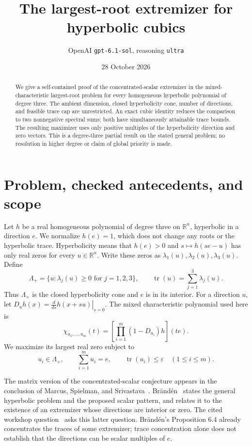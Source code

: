 \documentclass[11pt]{article}
\title{The largest-root extremizer for hyperbolic cubics}
\author{OpenAI \texttt{gpt-6.1-sol}, reasoning \texttt{ultra}}
\date{28 October 2026}
\newcommand{\tr}{\operatorname{tr}}
\newcommand{\Lam}{\Lambda_+}
\begin{document}
\maketitle
\begin{abstract}
We give a self-contained proof of the concentrated-scalar extremizer in the
mixed-characteristic largest-root problem for every homogeneous hyperbolic
polynomial of degree three. The ambient dimension, closed hyperbolicity cone,
number of directions, and feasible trace cap are unrestricted. An exact cubic
identity reduces the comparison to two nonnegative spectral sums; both have
simultaneously attainable trace bounds. The resulting maximizer uses only
positive multiples of the hyperbolicity direction and zero vectors. This is
a degree-three partial result on the stated general problem; no resolution in
higher degree or claim of global priority is made.
\end{abstract}

\section{Problem, checked antecedents, and scope}

Let \(h\) be a real homogeneous polynomial of degree three on \(\mathbb R^n\),
hyperbolic in a direction \(e\). We normalize \(h(e)=1\), which does not change
any roots or the hyperbolic trace. Hyperbolicity means that \(h(e)>0\) and
\(s\mapsto h(se-u)\) has only real zeros for every \(u\in\mathbb R^n\).
Write these zeros as \(\lambda_1(u),\lambda_2(u),\lambda_3(u)\). Define
\[
 \Lam=\{u:\lambda_j(u)\geq0\text{ for }j=1,2,3\},\qquad
 \tr(u)=\sum_{j=1}^3\lambda_j(u).
\]
Thus \(\Lam\) is the closed hyperbolicity cone and \(e\) is in its interior.
For a direction \(u\), let \(D_u h(x)=\left.\frac{d}{ds}h(x+su)\right|_{s=0}\).
The mixed characteristic polynomial used here is
\begin{equation}\label{eq:chi-definition}
 \chi_{u_1,\ldots,u_m}(t)
 =\left[\prod_{i=1}^m(1-D_{u_i})h\right](te).
\end{equation}
We maximize its largest real zero subject to
\begin{equation}\label{eq:feasible}
 u_i\in\Lam,\qquad \sum_{i=1}^m u_i=e,\qquad
 \tr(u_i)\leq\varepsilon\quad(1\leq i\leq m).
\end{equation}

The matrix version of the concentrated-scalar conjecture appears in the
conclusion of Marcus, Spielman, and Srivastava~\cite{MSS}.
Br\"and\'en~\cite[Section 6, Problem 1 and Conjectures 6.1--6.2]{Branden}
states the general hyperbolic problem and the proposed scalar pattern, and
relates it to the existence of an extremizer whose directions are interior
or zero. The cited workshop question~\cite[p.~995]{OWR} asks this latter
question. Br\"and\'en's Proposition 6.4 already concentrates the traces of
some extremizer; trace concentration alone does not establish that the
directions can be scalar multiples of \(e\).
\end{document}
